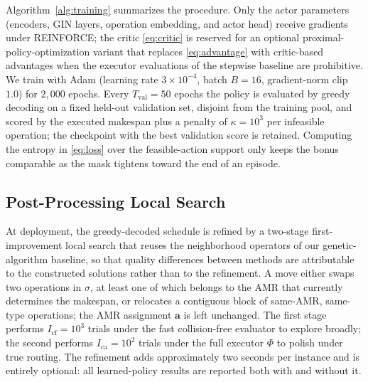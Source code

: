 Algorithm~\ref{alg:training} summarizes the procedure. Only the actor
parameters (encoders, GIN layers, operation embedding, and actor head)
receive gradients under REINFORCE; the critic \eqref{eq:critic} is
reserved for an optional proximal-policy-optimization variant
\cite{schulman2017ppo} that replaces \eqref{eq:advantage} with
critic-based advantages when the executor evaluations of the stepwise
baseline are prohibitive. We train with Adam \cite{kingma2015adam}
(learning rate $3\times10^{-4}$, batch $B=16$, gradient-norm clip
$1.0$) for $2{,}000$ epochs. Every $T_{\mathrm{val}}=50$ epochs the
policy is evaluated by greedy decoding on a fixed held-out validation
set, disjoint from the training pool, and scored by the executed
makespan plus a penalty of $\kappa=10^{3}$ per infeasible operation;
the checkpoint with the best validation score is retained. Computing
the entropy in \eqref{eq:loss} over the feasible-action support only
keeps the bonus comparable as the mask tightens toward the end of an
episode.

\subsection{Post-Processing Local Search}
\label{sec:localsearch}

At deployment, the greedy-decoded schedule is refined by a two-stage
first-improvement local search that reuses the neighborhood operators
of our genetic-algorithm baseline, so that quality differences between
methods are attributable to the constructed solutions rather than to
the refinement. A move either swaps two operations in $\sigma$, at
least one of which belongs to the AMR that currently determines the
makespan, or relocates a contiguous block of same-AMR, same-type
operations; the AMR assignment $\bm{a}$ is left unchanged. The first
stage performs $I_{\mathrm{cf}}=10^{3}$ trials under the fast
collision-free evaluator to explore broadly; the second performs
$I_{\mathrm{ca}}=10^{2}$ trials under the full executor $\Phi$ to
polish under true routing. The refinement adds approximately two
seconds per instance and is entirely optional: all learned-policy
results are reported both with and without it.

